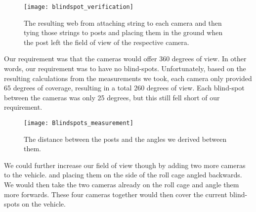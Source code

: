 \begin{figure}[H]
\centerline{\texttt{[image: blindspot\_verification]}}
\caption[]{The resulting web from attaching string to each camera and then tying those strings to posts and placing them in the ground when the post left the field of view of the respective camera.}
\label{fig:blindspot_verification}
\end{figure}

Our requirement was that the cameras would offer 360 degrees of view.  In other words, our requirement was to have no blind-spots.  Unfortunately, based on the resulting calculations from the measurements we took, each camera only provided 65 degrees of coverage, resulting in a total 260 degrees of view.  Each blind-spot between the cameras was only 25 degrees, but this still fell short of our requirement.

\begin{figure}[H]
\centerline{\texttt{[image: Blindspots\_measurement]}}
\caption[]{The distance between the posts and the angles we derived between them.}
\label{fig:blindspot_measurement}
\end{figure}

We could further increase our field of view though by adding two more cameras to the vehicle.  and placing them on the side of the roll cage angled backwards.  We would then take the two cameras already on the roll cage and angle them more forwards.  These four cameras together would then cover the current blind-spots on the vehicle.